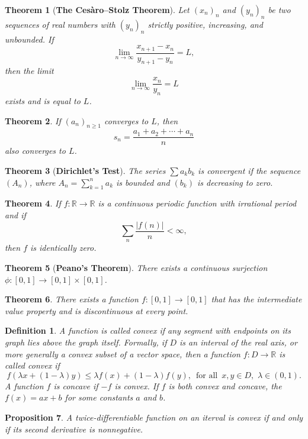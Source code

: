 \documentclass[answers, a4paper, 12pt]{exam}
\newtheorem{theorem}{Theorem}[section]
\newtheorem{proposition}[theorem]{Proposition}
\newtheorem{definition}{Definition}
\newcommand{\R}{\mathbb{R}}
\begin{document}
\begin{theorem}[\textbf{The Cesàro–Stolz Theorem}]
    Let $(x_n)_n$ and $(y_n)_n$ be two sequences of real numbers with $(y_n)_n$ strictly positive, increasing, and unbounded. If
    $$\lim_{n\to\infty}{\frac{x_{n+1}-x_n}{y_{n+1}-y_n}}=L,$$
    then the limit
    $$\lim_{n\to\infty}{\frac{x_n}{y_n}}=L$$
    exists and is equal to $L$.
\end{theorem}

\begin{theorem}
    If $(a_n)_{n\geq 1}$ converges to $L$, then
    $$s_n=\frac{a_1+a_2+\cdots+a_n}{n}$$
    also converges to $L$.
\end{theorem}

\begin{theorem}[\textbf{Dirichlet’s Test}]
    The series $\sum{a_k}{b_k}$ is convergent if the sequence $(A_n)$, where $A_n=\sum_{k=1}^{n}{a_k}$ is bounded and $(b_k)$ is decreasing to zero.
\end{theorem}

\begin{theorem}
    If $f:\R\to\R$ is a continuous periodic function with irrational period and if $$\sum_{n}{\frac{|f(n)|}{n}}<\infty,$$ then $f$ is identically zero.
\end{theorem}

\begin{theorem}[\textbf{Peano's Theorem}]
    There exists a continuous surjection $\phi:[0,1]\to[0,1]\times[0,1]$.
\end{theorem}

\begin{theorem}
    There exists a function $f:[0,1]\to[0,1]$ that has the intermediate value property and is discontinuous at every point.
\end{theorem}

\begin{definition}
    A function is called convex if any segment with endpoints on its graph lies above the graph itself. Formally, if $D$ is an interval of the real axis, or more generally a convex subset of a vector space, then a function $f:D\to\R$ is called convex if
    $$f(\lambda x+(1-\lambda)y)\leq \lambda f(x)+(1-\lambda)f(y),\,\,\,\text{for all}\,\,\,x,y\in D,\,\,\lambda\in(0,1).$$
    A function $f$ is concave if $-f$ is convex. If $f$ is both convex and concave, the $f(x)=ax+b$ for some constants $a$ and $b$.
\end{definition}
\begin{proposition}
    A twice-differentiable function on an iterval is convex if and only if its second derivative is nonnegative.
\end{proposition}
\end{document}
